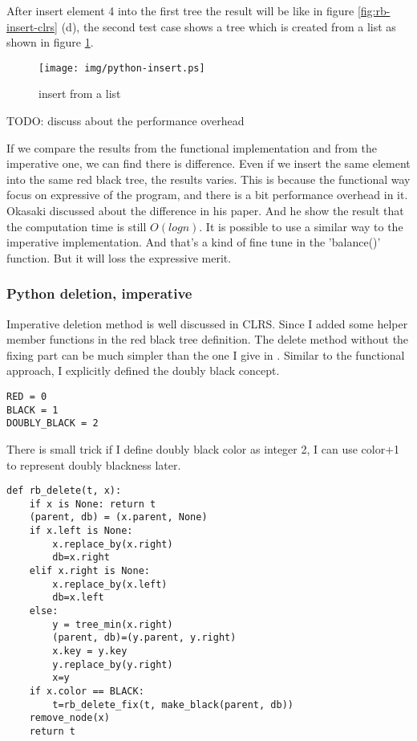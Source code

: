 \documentclass{article}
\begin{document}
After insert element 4 into the first tree the result will be like in figure \ref{fig:rb-insert-clrs} (d), the second test case shows a tree which is created from a list as shown in figure \ref{fig:python-insert}.

\begin{figure}[htbp]
       \begin{center}
	\texttt{[image: img/python-insert.ps]}
        \caption{insert from a list} \label{fig:python-insert}
       \end{center}
\end{figure}

TODO: discuss about the performance overhead

If we compare the results from the functional implementation and from the imperative one, we can 
find there is difference. Even if we insert the same element into the same red black tree, the
results varies. This is because the functional way focus on expressive of the program, and there 
is a bit performance overhead in it. Okasaki discussed about the difference in his paper\cite{okasaki}.
And he show the result that the computation time is still $O(log n)$. It is possible to use a 
similar way to the imperative implementation. And that's a kind of fine tune in the 'balance()'
function. But it will loss the expressive merit.


\subsubsection*{Python deletion, imperative}

Imperative deletion method is well discussed in CLRS. Since I added some helper member functions
in the red black tree definition. The delete method without the fixing part can be much simpler
than the one I give in \cite{bst-lxy}. Similar to the functional approach, I explicitly defined
the doubly black concept.

\lstset{language=Python}
\begin{lstlisting}
RED = 0
BLACK = 1
DOUBLY_BLACK = 2
\end{lstlisting}

There is small trick if I define doubly black color as integer 2, I can use color+1 to represent
doubly blackness later.

\lstset{language=Python}
\begin{lstlisting}
def rb_delete(t, x):
    if x is None: return t
    (parent, db) = (x.parent, None)
    if x.left is None:
        x.replace_by(x.right)
        db=x.right
    elif x.right is None:
        x.replace_by(x.left)
        db=x.left
    else:
        y = tree_min(x.right)
        (parent, db)=(y.parent, y.right)
        x.key = y.key
        y.replace_by(y.right)
        x=y
    if x.color == BLACK:
        t=rb_delete_fix(t, make_black(parent, db))
    remove_node(x)
    return t
\end{lstlisting}
\end{document}
